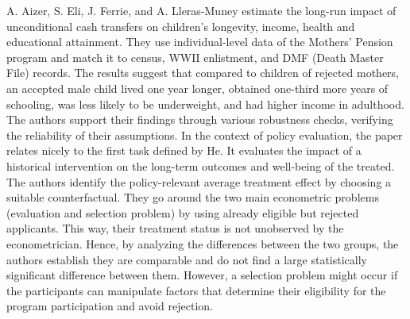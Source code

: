 A. Aizer, S. Eli, J. Ferrie, and A. Lleras-Muney estimate the long-run
impact of unconditional cash transfers on children's longevity, income,
health and educational attainment. They use individual-level data of
the Mothers' Pension program and match it to census, WWII enlistment,
and DMF (Death Master File) records. The results suggest that compared
to children of rejected mothers, an accepted male child lived one year
longer, obtained one-third more years of schooling, was less likely to
be underweight, and had higher income in adulthood. The authors support their
findings through various robustness checks, verifying the reliability
of their assumptions. In the context of policy evaluation, the paper 
relates nicely to the first task defined by He. It evaluates the impact of a historical intervention on the long-term outcomes and well-being of the treated. The authors identify the policy-relevant average treatment effect by choosing a suitable counterfactual. They go around the two main econometric problems (evaluation and selection problem) by using already eligible but rejected applicants. This way, their treatment status is not unobserved by the econometrician. Hence, by analyzing the differences between the two groups, the authors establish they are comparable and do not find a large statistically significant difference between them. However, a selection problem might occur if the participants can manipulate factors that determine their eligibility for the program participation and avoid rejection.